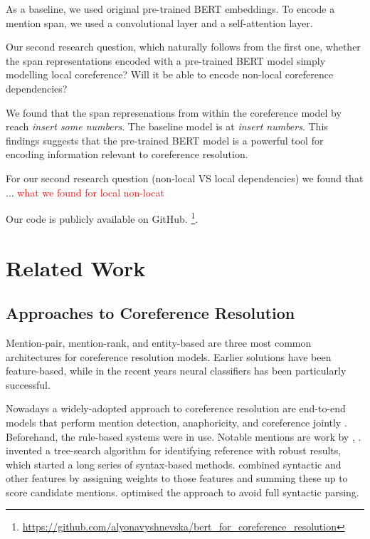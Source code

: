 \documentclass[11pt]{article}
\newcommand\todo[1]{\textcolor{red}{#1}}
\begin{document}
As a baseline, we used original pre-trained BERT embeddings. To encode a mention span,  we used a convolutional layer and a  self-attention layer.

Our second research question, which naturally follows from the first one, whether the span representations encoded with a pre-trained BERT model simply modelling local coreference? Will it be able to encode non-local coreference dependencies? 

We found that the span represenations from within the coreference model by \textcite{joshi2019coref} reach \textit{insert some numbers}. The baseline model is at \textit{insert numbers}. This findings suggests that the pre-trained BERT model is a powerful tool for encoding information relevant to coreference resolution. 

For our second research question (non-local VS local dependencies) we found that ... \todo{what we found for local non-locat}

Our code is publicly available on GitHub.  \footnote{\url{https://github.com/alyonavyshnevska/bert_for_coreference_resolution}}.


\section{Related Work} 

\subsection{Approaches to Coreference Resolution}

Mention-pair, mention-rank, and entity-based are three most common architectures for coreference resolution models. Earlier solutions have been feature-based, while in the recent years neural classifiers has been particularly successful.

Nowadays a widely-adopted approach to coreference resolution are end-to-end models that perform mention detection, anaphoricity, and coreference jointly \parencite{jurafsky2019}. Beforehand, the rule-based systems were in use. Notable mentions are work by \textcite{hobbs1978}, \textcite{lappin1994}. \textcite{hobbs1978} invented a tree-search algorithm for identifying reference with robust results, which started a long series of syntax-based methods.  \textcite{lappin1994} combined syntactic and other features by assigning weights to those features and summing these up to score candidate mentions. \textcite{kennedy1996} optimised the approach to avoid full syntactic parsing. 
\end{document}
